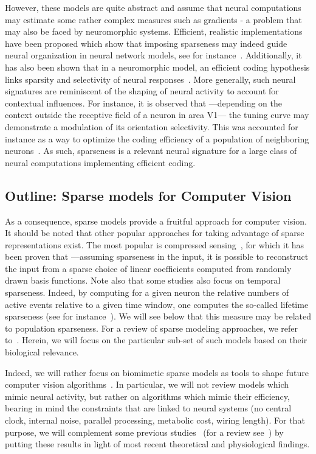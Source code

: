 \documentclass[a4paper, 11pt]{book}
\begin{document}
However, these models are quite abstract and assume that neural computations may estimate some rather complex measures such as gradients - a problem that may also be faced by neuromorphic systems.
Efficient, realistic implementations have been proposed which show that imposing sparseness
may indeed guide neural organization in neural network models, see for instance~\citep{Zylberberg11,Hunt13}.
Additionally, it has also been shown that in a neuromorphic model,
an efficient coding hypothesis links sparsity and selectivity of neural responses~\citep{Blattler11}.
More generally, such neural signatures are reminiscent of the shaping of neural activity to account for contextual influences.
For instance, it is observed that ---depending on the context outside the receptive field of a neuron in area V1--- the tuning curve may demonstrate a modulation of its orientation selectivity.
This was accounted for instance as a way to optimize the coding efficiency of a population of neighboring neurons~\citep{Series04}.
As such, sparseness is a relevant neural signature for a large class of neural computations implementing efficient coding.
%
\subsection{Outline: Sparse models for Computer Vision}
As a consequence, sparse models provide a fruitful approach for computer vision.
It should be noted that other popular approaches for taking advantage of sparse representations exist.
The most popular is compressed sensing~\citep{Ganguli12},
for which it has been proven that ---assuming sparseness in the input,
it is possible to reconstruct the input from a sparse choice
of linear coefficients computed from randomly drawn basis functions.
Note also that some studies also focus on temporal sparseness.
Indeed, by computing for a given neuron
the relative numbers of active events relative to a given time window,
one computes the so-called lifetime sparseness (see for instance~\citep{Willmore11}).
We will see below that this measure may be related to population sparseness.
For a review of sparse modeling approaches, we refer to~\citep{Elad10}.
Herein, we will focus on the particular sub-set of such models based on their biological relevance.

Indeed, we will rather focus on biomimetic sparse models as tools to shape future computer vision algorithms~\citep{Benoit10,Serre10}.
In particular, we will not review models which mimic neural activity,
but rather on algorithms which mimic their efficiency,
bearing in mind  the constraints that are linked to neural systems (no central clock, internal noise, parallel processing, metabolic cost, wiring length).
For that purpose, we will complement some previous studies~\citep{Perrinet03ieee,Fischer07,Perrinet08spie,Perrinet10shl} (for a review see~\citep{Perrinet07})
by putting these results in light of most recent theoretical and physiological findings.
\end{document}
